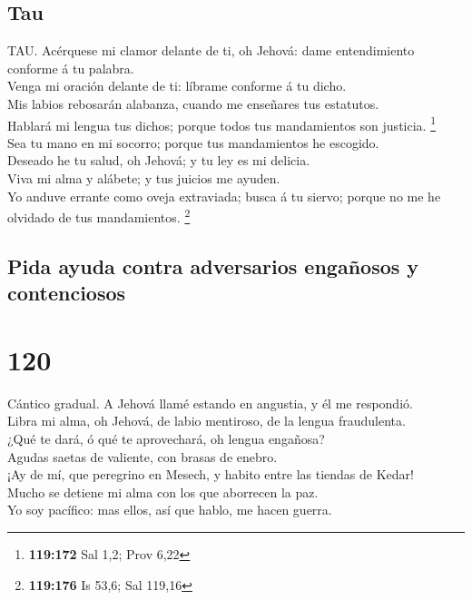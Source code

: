 \hypertarget{tau}{%
\subsection{Tau}\label{tau}}

 TAU. Acérquese mi clamor delante de ti, oh Jehová: dame
entendimiento conforme á tu palabra.\\
 Venga mi oración delante de ti: líbrame conforme á tu
dicho.\\
 Mis labios rebosarán alabanza, cuando me enseñares tus
estatutos.\\
 Hablará mi lengua tus dichos; porque todos tus
mandamientos son justicia. \footnote{\textbf{119:172} Sal 1,2; Prov 6,22}\\
 Sea tu mano en mi socorro; porque tus mandamientos he
escogido.\\
 Deseado he tu salud, oh Jehová; y tu ley es mi
delicia.\\
 Viva mi alma y alábete; y tus juicios me ayuden.\\
 Yo anduve errante como oveja extraviada; busca á tu
siervo; porque no me he olvidado de tus mandamientos. \footnote{\textbf{119:176}
  Is 53,6; Sal 119,16}

\hypertarget{pida-ayuda-contra-adversarios-engauxf1osos-y-contenciosos}{%
\subsection{Pida ayuda contra adversarios engañosos y
contenciosos}\label{pida-ayuda-contra-adversarios-engauxf1osos-y-contenciosos}}

\hypertarget{section-119}{%
\section{120}\label{section-119}}

 Cántico gradual. A Jehová llamé estando en angustia, y él
me respondió.\\
 Libra mi alma, oh Jehová, de labio mentiroso, de la
lengua fraudulenta.\\
 ¿Qué te dará, ó qué te aprovechará, oh lengua engañosa?\\
 Agudas saetas de valiente, con brasas de enebro.\\
 ¡Ay de mí, que peregrino en Mesech, y habito entre las
tiendas de Kedar!\\
 Mucho se detiene mi alma con los que aborrecen la paz.\\
 Yo soy pacífico: mas ellos, así que hablo, me hacen
guerra.


